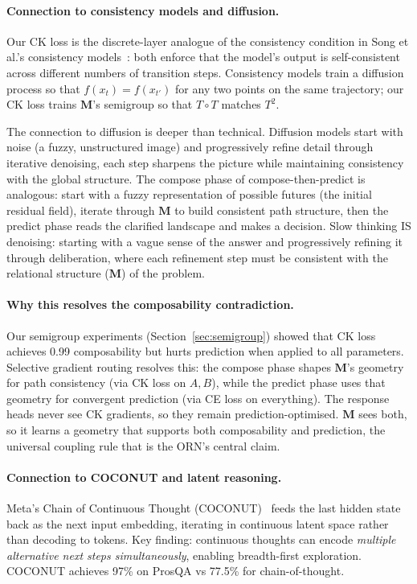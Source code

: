 \documentclass[11pt, a4paper]{article}
\newcommand{\M}{\mathbf{M}}
\theoremstyle{plain}
\theoremstyle{definition}
\theoremstyle{remark}
\begin{document}
\paragraph{Connection to consistency models and diffusion.}
Our CK loss is the discrete-layer analogue of the consistency condition in Song et al.'s consistency models~\cite{song2023consistency}: both enforce that the model's output is self-consistent across different numbers of transition steps.
Consistency models train a diffusion process so that $f(x_t) = f(x_{t'})$ for any two points on the same trajectory; our CK loss trains $\M$'s semigroup so that $T \circ T$ matches $T^2$.

The connection to diffusion is deeper than technical.
Diffusion models start with noise (a fuzzy, unstructured image) and progressively refine detail through iterative denoising, each step sharpens the picture while maintaining consistency with the global structure.
The compose phase of compose-then-predict is analogous: start with a fuzzy representation of possible futures (the initial residual field), iterate through $\M$ to build consistent path structure, then the predict phase reads the clarified landscape and makes a decision.
Slow thinking IS denoising: starting with a vague sense of the answer and progressively refining it through deliberation, where each refinement step must be consistent with the relational structure ($\M$) of the problem.

\paragraph{Why this resolves the composability contradiction.}
Our semigroup experiments (Section~\ref{sec:semigroup}) showed that CK loss achieves 0.99 composability but hurts prediction when applied to all parameters.
Selective gradient routing resolves this: the compose phase shapes $\M$'s geometry for path consistency (via CK loss on $A, B$), while the predict phase uses that geometry for convergent prediction (via CE loss on everything).
The response heads never see CK gradients, so they remain prediction-optimised.
$\M$ sees both, so it learns a geometry that supports both composability and prediction, the universal coupling rule that is the ORN's central claim.

\paragraph{Connection to COCONUT and latent reasoning.}
Meta's Chain of Continuous Thought (COCONUT)~\cite{coconut2024} feeds the last hidden state back as the next input embedding, iterating in continuous latent space rather than decoding to tokens.
Key finding: continuous thoughts can encode \emph{multiple alternative next steps simultaneously}, enabling breadth-first exploration.
COCONUT achieves 97\% on ProsQA vs 77.5\% for chain-of-thought.
\end{document}
